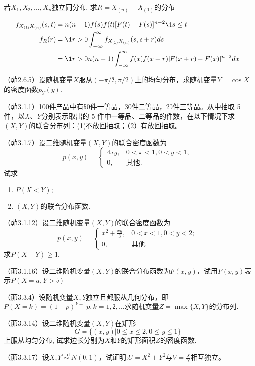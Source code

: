 \begin{example}
    若$X_1,X_2,\dotsc,X_n$独立同分布, 求$R=X_{(n)}-X_{(1)}$的分布
\end{example}
\begin{solution}
    \begin{align*}
        f_{X_{(1)}X_{(n)}}(s,t) &=n(n-1)f(s)f(t)[F(t)-F(s)]^{n-2}\1{s\le t} \\
        f_R(r) &=\1{r>0} \int_{-\infty}^{\infty}f_{X_{(1)}X_{(n)}}(s,s+r)ds \\
        &=\1{r>0} n(n-1)\int_{-\infty}^{\infty}f(x)f(x+r)[F(x+r)-F(x)]^{n-2}dx
    \end{align*}
\end{solution}

\begin{problemset}[错题记录]
    \item （茆2.6.5）设随机变量$X$服从$(-\pi/2,\pi/2)$上的均匀分布，求随机变量$Y=\cos X$的密度函数$p_Y(y)$.
    \item （茆3.1.1）100件产品中有50件一等品，30件二等品，20件三等品。从中抽取 5 件，以$X$、$Y$分别表示取出的 5 件中一等品、二等品的件数，在以下情况下求$(X,Y)$的联合分布列：(1)不放回抽取；（2）有放回抽取。
    \item （茆3.1.7）设二维随机变量$(X,Y)$的联合密度函数为
    \[ p(x, y)=\begin{cases}
            4 x y, & 0<x<1,0<y<1, \\
            0,     & \text{其他} .
        \end{cases}	\]
    试求
    \begin{enumerate}[(1)]
        \item$P(X<Y)$;
        \item$(X,Y)$的联合分布函数.
    \end{enumerate}
    \item （茆3.1.12）设二维随机变量$(X,Y)$的联合密度函数为
    \[
        p(x,y)=\begin{cases}
            x^2+\frac{xy}{3}, & 0<x<1,0<y<2; \\
            0,                & \text{其他} .
        \end{cases}
    \]
    求$P(X+Y)\geq 1$.
    \item （茆3.1.16）设二维随机变量$(X,Y)$的联合分布函数为$F(x,y)$，试用$F(x,y)$表示$P(X=a,Y>b)$
    \item （茆3.3.4）设随机变量$X,Y$独立且都服从几何分布，即$P(X=k)=(1-p)^{k-1}p,k=1,2,\ldots$求随机变量$Z=\max\{X,Y\}$的分布列.
    \item （茆3.3.14）设二维随机变量$(X,Y)$在矩形
    \[ G=\{(x,y)|0 \le x \le 2,0 \le y \le 1\} \]
    上服从均匀分布, 试求边长分别为$X$和$Y$的矩形面积$Z$的密度函数.
    \item （茆3.3.17）设$X,Y \overset{\text{i.i.d.}}{\sim} N(0,1)$，试证明:$U=X^2+Y^2$与$V=\frac{X}{Y}$相互独立。
\end{problemset}
